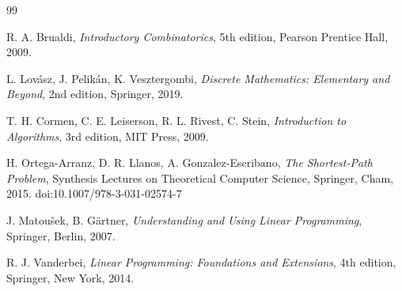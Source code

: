 \documentclass[12pt]{report}
\begin{document}
\begin{thebibliography}{99}

R. A. Brualdi,
\textit{Introductory Combinatorics},
5th edition,
Pearson Prentice Hall, 2009.

L. Lov\'asz, J. Pelik\'an, K. Vesztergombi,
\textit{Discrete Mathematics: Elementary and Beyond},
2nd edition,
Springer, 2019.

T. H. Cormen, C. E. Leiserson, R. L. Rivest, C. Stein,
\textit{Introduction to Algorithms},
3rd edition,
MIT Press, 2009.

H. Ortega-Arranz, D. R. Llanos, A. Gonzalez-Escribano,
\textit{The Shortest-Path Problem},
Synthesis Lectures on Theoretical Computer Science,
Springer, Cham, 2015.
doi:10.1007/978-3-031-02574-7

J. Matou\v{s}ek, B. G\"artner,
\textit{Understanding and Using Linear Programming},
Springer, Berlin, 2007.

R. J. Vanderbei,
\textit{Linear Programming: Foundations and Extensions},
4th edition,
Springer, New York, 2014.

\end{thebibliography}
\end{document}
